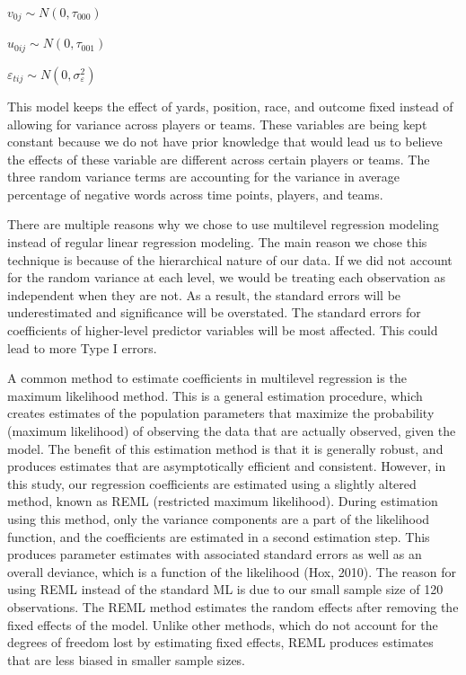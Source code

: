 \documentclass[12pt,twoside]{reedthesis}
\begin{document}
\(v_{0j} \sim N(0, \tau_{000})\)

\(u_{0ij} \sim N(0, \tau_{001})\)

\(\varepsilon_{tij} \sim N(0, \sigma_{\varepsilon}^2)\)

This model keeps the effect of yards, position, race, and outcome fixed
instead of allowing for variance across players or teams. These
variables are being kept constant because we do not have prior knowledge
that would lead us to believe the effects of these variable are
different across certain players or teams. The three random variance
terms are accounting for the variance in average percentage of negative
words across time points, players, and teams.

There are multiple reasons why we chose to use multilevel regression
modeling instead of regular linear regression modeling. The main reason
we chose this technique is because of the hierarchical nature of our
data. If we did not account for the random variance at each level, we
would be treating each observation as independent when they are not. As
a result, the standard errors will be underestimated and significance
will be overstated. The standard errors for coefficients of higher-level
predictor variables will be most affected. This could lead to more Type
I errors.

A common method to estimate coefficients in multilevel regression is the
maximum likelihood method. This is a general estimation procedure, which
creates estimates of the population parameters that maximize the
probability (maximum likelihood) of observing the data that are actually
observed, given the model. The benefit of this estimation method is that
it is generally robust, and produces estimates that are asymptotically
efficient and consistent. However, in this study, our regression
coefficients are estimated using a slightly altered method, known as
REML (restricted maximum likelihood). During estimation using this
method, only the variance components are a part of the likelihood
function, and the coefficients are estimated in a second estimation
step. This produces parameter estimates with associated standard errors
as well as an overall deviance, which is a function of the likelihood
(Hox, 2010). The reason for using REML instead of the standard ML is due
to our small sample size of 120 observations. The REML method estimates
the random effects after removing the fixed effects of the model. Unlike
other methods, which do not account for the degrees of freedom lost by
estimating fixed effects, REML produces estimates that are less biased
in smaller sample sizes.
\end{document}
